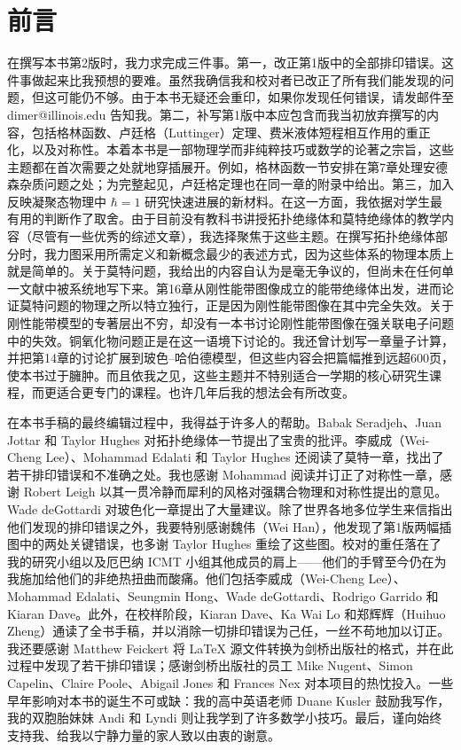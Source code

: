 \chapter*{前言}

在撰写本书第2版时，我力求完成三件事。第一，改正第1版中的全部排印错误。这件事做起来比我预想的要难。虽然我确信我和校对者已改正了所有我们能发现的问题，但这可能仍不够。由于本书无疑还会重印，如果你发现任何错误，请发邮件至 dimer@illinois.edu 告知我。第二，补写第1版中本应包含而我当初放弃撰写的内容，包括格林函数、卢廷格（Luttinger）定理、费米液体短程相互作用的重正化，以及对称性。本着本书是一部物理学而非纯粹技巧或数学的论著之宗旨，这些主题都在首次需要之处就地穿插展开。例如，格林函数一节安排在第7章处理安德森杂质问题之处；为完整起见，卢廷格定理也在同一章的附录中给出。第三，加入反映凝聚态物理中 $\hbar=1$ 研究快速进展的新材料。在这一方面，我依据对学生最有用的判断作了取舍。由于目前没有教科书讲授拓扑绝缘体和莫特绝缘体的教学内容（尽管有一些优秀的综述文章），我选择聚焦于这些主题。在撰写拓扑绝缘体部分时，我力图采用所需定义和新概念最少的表述方式，因为这些体系的物理本质上就是简单的。关于莫特问题，我给出的内容自认为是毫无争议的，但尚未在任何单一文献中被系统地写下来。第16章从刚性能带图像成立的能带绝缘体出发，进而论证莫特问题的物理之所以特立独行，正是因为刚性能带图像在其中完全失效。关于刚性能带模型的专著层出不穷，却没有一本书讨论刚性能带图像在强关联电子问题中的失效。铜氧化物问题正是在这一语境下讨论的。我还曾计划写一章量子计算，并把第14章的讨论扩展到玻色–哈伯德模型，但这些内容会把篇幅推到远超600页，使本书过于臃肿。而且依我之见，这些主题并不特别适合一学期的核心研究生课程，而更适合更专门的课程。也许几年后我的想法会有所改变。

在本书手稿的最终编辑过程中，我得益于许多人的帮助。Babak Seradjeh、Juan Jottar 和 Taylor Hughes 对拓扑绝缘体一节提出了宝贵的批评。李威成（Wei-Cheng Lee）、Mohammad Edalati 和 Taylor Hughes 还阅读了莫特一章，找出了若干排印错误和不准确之处。我也感谢 Mohammad 阅读并订正了对称性一章，感谢 Robert Leigh 以其一贯冷静而犀利的风格对强耦合物理和对称性提出的意见。Wade deGottardi 对玻色化一章提出了大量建议。除了世界各地多位学生来信指出他们发现的排印错误之外，我要特别感谢魏伟（Wei Han），他发现了第1版两幅插图中的两处关键错误，也多谢 Taylor Hughes 重绘了这些图。校对的重任落在了我的研究小组以及厄巴纳 ICMT 小组其他成员的肩上——他们的手臂至今仍在为我施加给他们的非绝热扭曲而酸痛。他们包括李威成（Wei-Cheng Lee）、Mohammad Edalati、Seungmin Hong、Wade deGottardi、Rodrigo Garrido 和 Kiaran Dave。此外，在校样阶段，Kiaran Dave、Ka Wai Lo 和郑辉辉（Huihuo Zheng）通读了全书手稿，并以消除一切排印错误为己任，一丝不苟地加以订正。我还要感谢 Matthew Feickert 将 \LaTeX{} 源文件转换为剑桥出版社的格式，并在此过程中发现了若干排印错误；感谢剑桥出版社的员工 Mike Nugent、Simon Capelin、Claire Poole、Abigail Jones 和 Frances Nex 对本项目的热忱投入。一些早年影响对本书的诞生不可或缺：我的高中英语老师 Duane Kusler 鼓励我写作，我的双胞胎妹妹 Andi 和 Lyndi 则让我学到了许多数学小技巧。最后，谨向始终支持我、给我以宁静力量的家人致以由衷的谢意。
